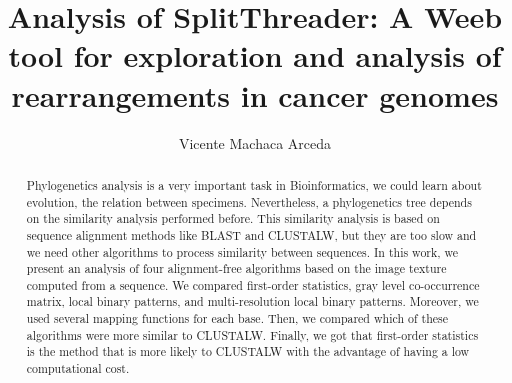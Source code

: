 \documentclass{svproc}
\begin{document}
\mainmatter              %
%
\title{Analysis of SplitThreader: A Weeb tool for exploration and analysis of rearrangements in cancer genomes}
%

\author{Vicente Machaca Arceda }


\maketitle             

\begin{abstract}

Phylogenetics analysis is a very important task in Bioinformatics, we could learn about evolution, the relation between specimens. Nevertheless, a phylogenetics tree depends on the similarity analysis performed before. This similarity analysis is based on sequence alignment methods like  BLAST and CLUSTALW, but they are too slow and we need other algorithms to process similarity between sequences. In this work, we present an analysis of four alignment-free algorithms based on the image texture computed from a sequence. We compared first-order statistics, gray level co-occurrence matrix, local binary patterns, and multi-resolution local binary patterns. Moreover, we used several mapping functions for each base. Then, we compared which of these algorithms were more similar to CLUSTALW. Finally, we got that first-order statistics is the method that is more likely to CLUSTALW with the advantage of having a low computational cost.

\end{abstract}



\end{document}
